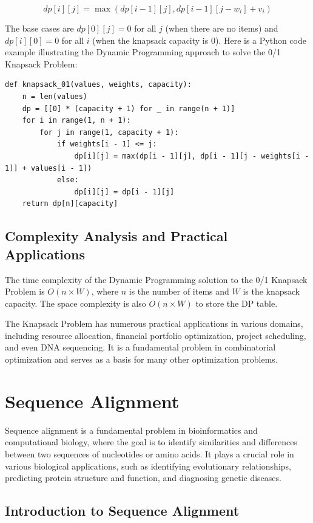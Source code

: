 \documentclass[12pt]{book} %
\begin{document}
\[
dp[i][j] = \max(dp[i-1][j], dp[i-1][j-w_i] + v_i)
\]

The base cases are \(dp[0][j] = 0\) for all \(j\) (when there are no items) and \(dp[i][0] = 0\) for all \(i\) (when the knapsack capacity is 0).
\FloatBarrier
Here is a Python code example illustrating the Dynamic Programming approach to solve the 0/1 Knapsack Problem:
\FloatBarrier
\begin{lstlisting}
def knapsack_01(values, weights, capacity):
    n = len(values)
    dp = [[0] * (capacity + 1) for _ in range(n + 1)]
    for i in range(1, n + 1):
        for j in range(1, capacity + 1):
            if weights[i - 1] <= j:
                dp[i][j] = max(dp[i - 1][j], dp[i - 1][j - weights[i - 1]] + values[i - 1])
            else:
                dp[i][j] = dp[i - 1][j]
    return dp[n][capacity]
\end{lstlisting}
\FloatBarrier
\subsection{Complexity Analysis and Practical Applications}

The time complexity of the Dynamic Programming solution to the 0/1 Knapsack Problem is \(O(n \times W)\), where \(n\) is the number of items and \(W\) is the knapsack capacity. The space complexity is also \(O(n \times W)\) to store the DP table.

The Knapsack Problem has numerous practical applications in various domains, including resource allocation, financial portfolio optimization, project scheduling, and even DNA sequencing. It is a fundamental problem in combinatorial optimization and serves as a basis for many other optimization problems.

\section{Sequence Alignment}

Sequence alignment is a fundamental problem in bioinformatics and computational biology, where the goal is to identify similarities and differences between two sequences of nucleotides or amino acids. It plays a crucial role in various biological applications, such as identifying evolutionary relationships, predicting protein structure and function, and diagnosing genetic diseases.

\subsection{Introduction to Sequence Alignment}
\end{document}

